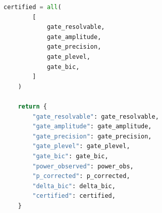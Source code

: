 \begin{lstlisting}[language=Python, caption={Certified Three-Stage Radix-Agnostic Protocol Engine}, label={lst:protocol}]
    certified = all(
        [
            gate_resolvable,
            gate_amplitude,
            gate_precision,
            gate_plevel,
            gate_bic,
        ]
    )

    return {
        "gate_resolvable": gate_resolvable,
        "gate_amplitude": gate_amplitude,
        "gate_precision": gate_precision,
        "gate_plevel": gate_plevel,
        "gate_bic": gate_bic,
        "power_observed": power_obs,
        "p_corrected": p_corrected,
        "delta_bic": delta_bic,
        "certified": certified,
    }
\end{lstlisting}
